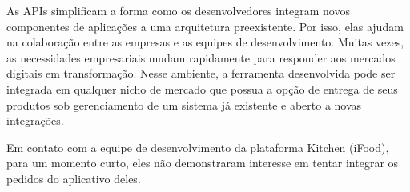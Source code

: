 As APIs simplificam a forma como os desenvolvedores integram novos componentes de aplicações a uma arquitetura preexistente. Por isso, elas ajudam na colaboração entre as empresas e as equipes de desenvolvimento. Muitas vezes, as necessidades empresariais mudam rapidamente para responder aos mercados digitais em transformação. Nesse ambiente, a ferramenta desenvolvida pode ser integrada em qualquer nicho de mercado que possua a opção de entrega de seus produtos sob gerenciamento de um sistema já existente e aberto a novas integrações.

Em contato com a equipe de desenvolvimento da plataforma Kitchen (iFood), para um momento curto, eles não demonstraram interesse em tentar integrar os pedidos do aplicativo deles.